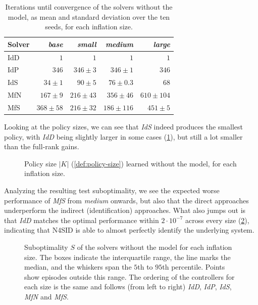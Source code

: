 \begin{table}[htbp]
  \centering
  \caption{Iterations until convergence of the solvers without the model, as mean and standard deviation over the ten seeds,
  for each inflation size.}
  \label{tab:identified-iterations}
  \begin{tabular}{@{}lrrrr@{}}
    \toprule
    Solver & \emph{base} & \emph{small} & \emph{medium} & \emph{large} \\
    \midrule
    IdD & $1$            & $1$            & $1$             & $1$             \\
    IdP & $346$          & $346 \pm 3$    & $346 \pm 1$     & $346$           \\
    IdS & $34 \pm 1$     & $90 \pm 5$     & $76 \pm 0.3$      & $68$            \\
    MfN & $167 \pm 9$    & $216 \pm 43$   & $356 \pm 46$    & $610 \pm 104$   \\
    MfS & $368 \pm 58$   & $216 \pm 32$   & $186 \pm 116$   & $451 \pm 5$     \\
    \bottomrule
  \end{tabular}
\end{table}

Looking at the policy sizes, we can see that \emph{IdS} indeed produces the smallest policy, with \emph{IdD}
being slightly larger in some cases (\cref{fig:identified-across-sizes-complexity}), but still a lot smaller
than the full-rank gains.

\begin{figure}[htbp]
  \centering
  \caption{Policy size $\lvert K \rvert$ (\cref{def:policy-size}) learned without the model, for each inflation size.}
  \label{fig:identified-across-sizes-complexity}
\end{figure}

Analyzing the resulting test suboptimality, we see the expected worse performance of \emph{MfS} from \emph{medium} onwards, but also that the direct approaches
underperform the indirect (identification) approaches. What also jumps out is that \emph{IdD} matches
the optimal performance within $2 \cdot 10^{-7}$ across every size (\cref{fig:identified-across-sizes-subopt}),
indicating that N4SID is able to almost perfectly identify the underlying system.

\begin{figure}[htbp]
  \centering
  \caption{Suboptimality $S$ of the solvers without the model for each inflation size. The boxes indicate the interquartile
  range, the line marks the median, and the whiskers span the $5$th to $95$th percentile. Points show episodes outside this range.
  The ordering of the controllers for each size is the same and follows (from left to right) \emph{IdD}, \emph{IdP}, \emph{IdS}, \emph{MfN} and \emph{MfS}.}
  \label{fig:identified-across-sizes-subopt}
\end{figure}

